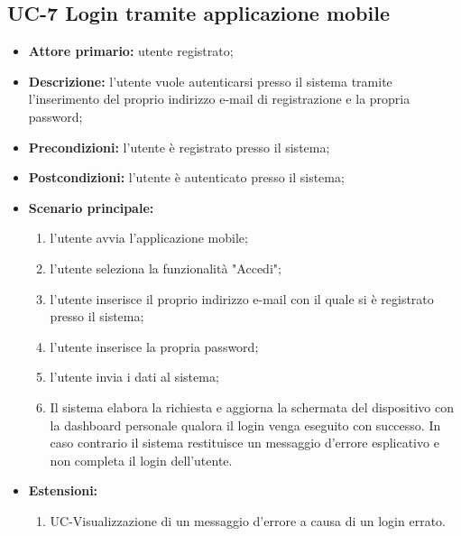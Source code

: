 \subsection{UC-7 Login tramite applicazione mobile}
\begin{itemize}
	\item \textbf{Attore primario:} utente registrato;

	\item \textbf{Descrizione:} l'utente vuole autenticarsi presso il sistema tramite l'inserimento del proprio indirizzo e-mail di registrazione e la propria password;

	\item \textbf{Precondizioni:} l'utente è registrato presso il sistema;

	\item \textbf{Postcondizioni:} l'utente è autenticato presso il sistema;

	\item\textbf{Scenario principale:}

	      \begin{enumerate}
		      \item l'utente avvia l'applicazione mobile;
		      \item l'utente seleziona la funzionalità "Accedi";
		      \item l'utente inserisce il proprio indirizzo e-mail con il quale si è registrato presso il sistema;
		      \item l'utente inserisce la propria password;
		      \item l'utente invia i dati al sistema;
		      \item Il sistema elabora la richiesta e aggiorna la schermata del dispositivo con la dashboard personale qualora il login venga eseguito con successo. In caso contrario il sistema restituisce un messaggio d'errore esplicativo e non completa il login dell'utente.
	      \end{enumerate}
	\item \textbf{Estensioni:}
	      \begin{enumerate}
		      \item UC-Visualizzazione di un messaggio d'errore a causa di un login errato.
	      \end{enumerate}
\end{itemize}

